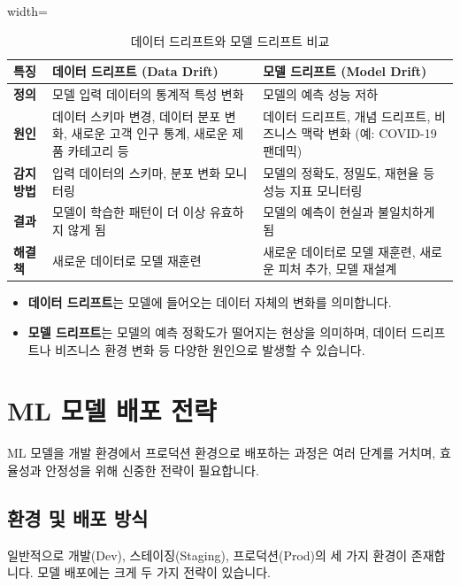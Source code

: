 \documentclass[11pt,a4paper]{article}
\begin{document}
\begin{table}[h!]
\caption{데이터 드리프트와 모델 드리프트 비교}
\label{tab:drift_comparison}
\centering
\begin{adjustbox}{width=\textwidth}
\begin{tabular}{lll}
\toprule
\textbf{특징} & \textbf{데이터 드리프트 (Data Drift)} & \textbf{모델 드리프트 (Model Drift)} \\
\midrule
\textbf{정의} & 모델 입력 데이터의 통계적 특성 변화 & 모델의 예측 성능 저하 \\
\textbf{원인} & 데이터 스키마 변경, 데이터 분포 변화, 새로운 고객 인구 통계, 새로운 제품 카테고리 등 & 데이터 드리프트, 개념 드리프트, 비즈니스 맥락 변화 (예: COVID-19 팬데믹) \\
\textbf{감지 방법} & 입력 데이터의 스키마, 분포 변화 모니터링 & 모델의 정확도, 정밀도, 재현율 등 성능 지표 모니터링 \\
\textbf{결과} & 모델이 학습한 패턴이 더 이상 유효하지 않게 됨 & 모델의 예측이 현실과 불일치하게 됨 \\
\textbf{해결책} & 새로운 데이터로 모델 재훈련 & 새로운 데이터로 모델 재훈련, 새로운 피처 추가, 모델 재설계 \\
\bottomrule
\end{tabular}
\end{adjustbox}
\vspace{1em}
\begin{itemize}
    \item \textbf{데이터 드리프트}는 모델에 들어오는 데이터 자체의 변화를 의미합니다.
    \item \textbf{모델 드리프트}는 모델의 예측 정확도가 떨어지는 현상을 의미하며, 데이터 드리프트나 비즈니스 환경 변화 등 다양한 원인으로 발생할 수 있습니다.
\end{itemize}
\end{table}

\newpage
\section{ML 모델 배포 전략}

ML 모델을 개발 환경에서 프로덕션 환경으로 배포하는 과정은 여러 단계를 거치며, 효율성과 안정성을 위해 신중한 전략이 필요합니다.

\subsection{환경 및 배포 방식}

일반적으로 개발(Dev), 스테이징(Staging), 프로덕션(Prod)의 세 가지 환경이 존재합니다. 모델 배포에는 크게 두 가지 전략이 있습니다.
\end{document}
